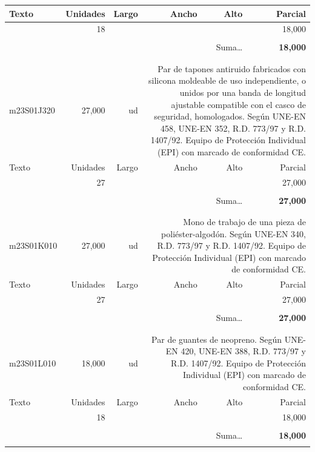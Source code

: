 \documentclass{book}%
\begin{document}
\begin{longtable}{lrrrrr}
Texto&Unidades&Largo&Ancho&Alto&Parcial\\%
\hline%
\multicolumn{1}{p{3.5cm}}{ }&18&&&&    18,000\\%
&&&&&\\%
\multicolumn{5}{r}{Suma\ldots}&\textbf{    18,000}\\%
\hline%
&&&&&\\%
&&&&&\\%
m23S01J320&    27,000& ud&\multicolumn{3}{p{6cm}}{\scriptsize Par de tapones antiruido fabricados con silicona moldeable de uso independiente, o unidos por una banda de longitud ajustable compatible con el casco de seguridad, homologados. Según UNE-EN 458, UNE-EN 352, R.D. 773/97 y R.D. 1407/92. Equipo de Protección Individual (EPI) con marcado de conformidad CE.\normalsize}\\%
Texto&Unidades&Largo&Ancho&Alto&Parcial\\%
\hline%
\multicolumn{1}{p{3.5cm}}{ }&27&&&&    27,000\\%
&&&&&\\%
\multicolumn{5}{r}{Suma\ldots}&\textbf{    27,000}\\%
\hline%
&&&&&\\%
&&&&&\\%
m23S01K010&    27,000& ud&\multicolumn{3}{p{6cm}}{\scriptsize Mono de trabajo de una pieza de poliéster-algodón. Según UNE-EN 340, R.D. 773/97 y R.D. 1407/92. Equipo de Protección Individual (EPI) con marcado de conformidad CE.\normalsize}\\%
Texto&Unidades&Largo&Ancho&Alto&Parcial\\%
\hline%
\multicolumn{1}{p{3.5cm}}{ }&27&&&&    27,000\\%
&&&&&\\%
\multicolumn{5}{r}{Suma\ldots}&\textbf{    27,000}\\%
\hline%
&&&&&\\%
&&&&&\\%
m23S01L010&    18,000& ud&\multicolumn{3}{p{6cm}}{\scriptsize Par de guantes de neopreno. Según UNE-EN 420, UNE-EN 388, R.D. 773/97 y R.D. 1407/92. Equipo de Protección Individual (EPI) con marcado de conformidad CE.\normalsize}\\%
Texto&Unidades&Largo&Ancho&Alto&Parcial\\%
\hline%
\multicolumn{1}{p{3.5cm}}{ }&18&&&&    18,000\\%
&&&&&\\%
\multicolumn{5}{r}{Suma\ldots}&\textbf{    18,000}\\%
\hline%
&&&&&\\%

\end{longtable}
\end{document}
